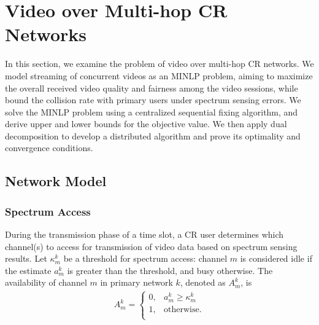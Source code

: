 \documentclass[12pt,onecolumn,draftclsnofoot]{IEEEtran} %
\begin{document}
\section{Video over Multi-hop CR Networks}\label{sec:cr_video_mhop}
%
In this section, we examine the problem of video over multi-hop CR networks. We model streaming of concurrent videos as an MINLP problem, aiming to maximize the overall received video quality and fairness among the video sessions, while bound the collision rate with primary users under spectrum sensing errors. We solve the
MINLP problem using a centralized sequential fixing algorithm, and derive upper and lower bounds for the objective value. We then apply dual decomposition to develop a distributed algorithm and prove its optimality and convergence conditions.

\subsection{Network Model}

\subsubsection{Spectrum Access \label{subsec:dsa}}

During the transmission phase of a time slot, a CR user determines which channel(s) to access for transmission of video data based on spectrum sensing results.  Let $\kappa_m^k$ be a threshold  for spectrum access: channel $m$ is considered idle if the estimate $a_m^k$ is greater than the threshold, and busy otherwise. The availability of channel $m$ in primary network $k$, denoted as $A_m^k$, is
\begin{eqnarray}\label{eq:DefAmk}
	A_m^k=\left\{
	\begin{array}{ll}
	0, & \mbox{$a_m^k \ge \kappa_m^k$}\\
	1, & \mbox{otherwise.}\\
\end{array}\right.
\end{eqnarray}
\end{document}
